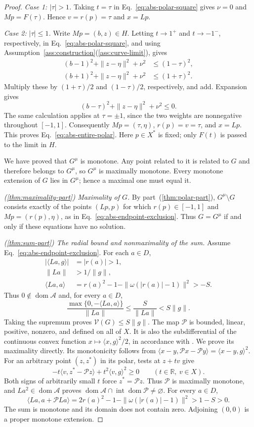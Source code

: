 \documentclass[11pt]{article}
\newcommand{\R}{\mathbb R}
\newcommand{\dom}{\operatorname{dom}}
\newcommand{\pair}[2]{\langle #1,#2\rangle}
\theoremstyle{definition}
\theoremstyle{remark}
\begin{document}
\begin{proof}
\emph{Case 1: $|\tau|>1$.}
Taking $t=\tau$ in Eq.~\eqref{eq:abs-polar-square} gives
$\nu=0$ and $Mp=F(\tau)$. Hence $v=r(p)=\tau$ and $x=Lp$.

\emph{Case 2: $|\tau|\le1$.}
Write $Mp=(b,z)\in H$. Letting $t\to1^+$ and $t\to-1^-$,
respectively, in Eq.~\eqref{eq:abs-polar-square}, and using
Assumption~\ref{ass:construction}\textup{(\ref{ass:curve-limit})}, gives
\[
\begin{aligned}
(b-1)^2+\|z-\eta\|^2+\nu^2&\le(1-\tau)^2,\\
(b+1)^2+\|z-\eta\|^2+\nu^2&\le(1+\tau)^2.
\end{aligned}
\]
Multiply these by $(1+\tau)/2$ and $(1-\tau)/2$, respectively,
and add. Expansion gives
\[
(b-\tau)^2+\|z-\eta\|^2+\nu^2\le0.
\]
The same calculation applies at $\tau=\pm1$, since the two weights
are nonnegative throughout $[-1,1]$.
Consequently $Mp=(\tau,\eta)$, $r(p)=v=\tau$, and $x=Lp$.
This proves Eq.~\eqref{eq:abs-entire-polar}. Here $p\in X^*$ is fixed;
only $F(t)$ is passed to the limit in $H$.

We have proved that $G^\mu$ is monotone. Any point related to it
is related to $G$ and therefore belongs to $G^\mu$, so $G^\mu$
is maximally monotone. Every monotone extension of $G$ lies in
$G^\mu$; hence a maximal one must equal it.

\noindent\textit{\textup{(\ref{thm:maximality-part})} Maximality of $G$.}
By part~\textup{(\ref{thm:polar-part})}, $G^\mu\setminus G$ consists exactly of the points $(Lp,p)$ for which
$r(p)\in[-1,1]$ and $Mp=(r(p),\eta)$, as in
Eq.~\eqref{eq:abs-endpoint-exclusion}. Thus $G=G^\mu$ if and only if
these equations have no solution.

\noindent\textit{\textup{(\ref{thm:sum-part})} The radial bound and nonmaximality of the sum.}
Assume Eq.~\eqref{eq:abs-endpoint-exclusion}. For each $a\in D$,
\[
\begin{aligned}
|\pair{La}{g}|&=|r(a)|>1,\\
\|La\|&>1/\|g\|,\\
\pair{La}{a}&=r(a)^2-1-\|\omega(|r(a)|-1)\|^2>-S.
\end{aligned}
\]
Thus $0\notin\dom\mathcal A$ and, for every $a\in D$,
\[
\frac{\max\{0,-\pair{La}{a}\}}{\|La\|}
\le\frac{S}{\|La\|}<S\|g\|.
\]
Taking the supremum proves $\mathcal V(G)\le S\|g\|$.
The map $\mathcal P$ is bounded, linear, positive, nonzero, and
defined on all of $X$. It is also the subdifferential of the continuous
convex function $x\mapsto\pair{x}{g}^2/2$, in accordance with
\cite{rockafellar1970subdiff}. We prove its maximality directly.
Its monotonicity follows from
$\pair{x-y}{\mathcal Px-\mathcal Py}=\pair{x-y}{g}^2$.
For an arbitrary point $(z,z^*)$ in its polar, tests at $z+tv$ give
\[
-t\pair{v}{z^*-\mathcal Pz}+t^2\pair{v}{g}^2\ge0
\qquad(t\in\R,\ v\in X).
\]
Both signs of arbitrarily small $t$ force $z^*=\mathcal Pz$.
Thus $\mathcal P$ is maximally monotone, and $La^2\in\dom\mathcal A$
proves $\dom\mathcal A\cap\operatorname{int}\dom\mathcal P\ne\varnothing$.
For every $a\in D$,
\[
\pair{La}{a+\mathcal PLa}
=2r(a)^2-1-\|\omega(|r(a)|-1)\|^2>1-S>0.
\]
The sum is monotone and its domain does not contain zero. Adjoining $(0,0)$
is a proper monotone extension.
\end{proof}
\end{document}
